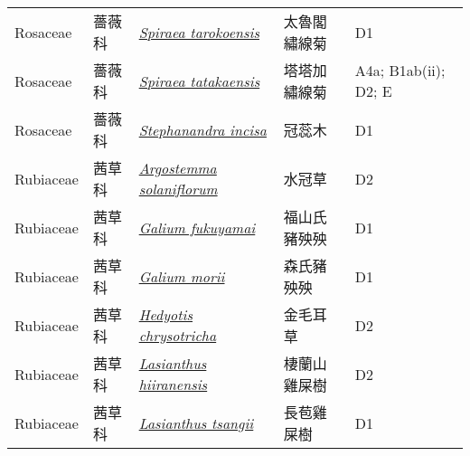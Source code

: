 {\begin{longtable}{L{2.5cm}L{2cm}L{5cm}L{2.5cm}L{3cm}}
    Rosaceae & 薔薇科 & \href{http://www.theplantlist.org/tpl1.1/search?q=Spiraea+tarokoensis}{\textit{Spiraea tarokoensis} } & 太魯閣繡線菊 & D1    \\
    Rosaceae & 薔薇科 & \href{http://www.theplantlist.org/tpl1.1/search?q=Spiraea+tatakaensis}{\textit{Spiraea tatakaensis} } & 塔塔加繡線菊 & A4a; B1ab(ii); D2; E    \\
    Rosaceae & 薔薇科 & \href{http://www.theplantlist.org/tpl1.1/search?q=Stephanandra+incisa}{\textit{Stephanandra incisa} } & 冠蕊木 & D1    \\
    Rubiaceae & 茜草科 & \href{http://www.theplantlist.org/tpl1.1/search?q=Argostemma+solaniflorum}{\textit{Argostemma solaniflorum} } & 水冠草 & D2    \\
    Rubiaceae & 茜草科 & \href{http://www.theplantlist.org/tpl1.1/search?q=Galium+fukuyamai}{\textit{Galium fukuyamai} } & 福山氏豬殃殃 & D1    \\
    Rubiaceae & 茜草科 & \href{http://www.theplantlist.org/tpl1.1/search?q=Galium+morii}{\textit{Galium morii} } & 森氏豬殃殃 & D1    \\
    Rubiaceae & 茜草科 & \href{http://www.theplantlist.org/tpl1.1/search?q=Hedyotis+chrysotricha}{\textit{Hedyotis chrysotricha} } & 金毛耳草 & D2    \\
    Rubiaceae & 茜草科 & \href{http://www.theplantlist.org/tpl1.1/search?q=Lasianthus+hiiranensis}{\textit{Lasianthus hiiranensis} } & 棲蘭山雞屎樹 & D2    \\
    Rubiaceae & 茜草科 & \href{http://www.theplantlist.org/tpl1.1/search?q=Lasianthus+tsangii}{\textit{Lasianthus tsangii} } & 長苞雞屎樹 & D1    \\

\end{longtable}}
